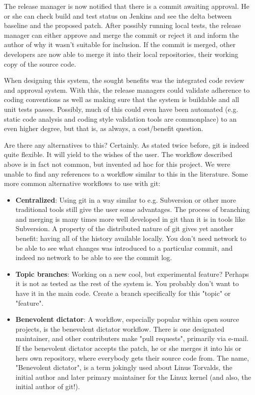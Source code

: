 \documentclass{article}
\begin{document}
The release manager is now notified that there is a commit awaiting
approval. He or she can check build and test status on Jenkins and see the
delta between baseline and the proposed patch. After possibly running local
tests, the release manager can either approve and merge the commit or
reject it and inform the author of why it wasn't suitable for inclusion.
If the commit is merged, other developers are now able to merge it into
their local repositories, their working copy of the source code.

When designing this system, the sought benefits was the integrated code 
review and approval system. With this, the release managers could validate 
adherence to coding conventions as well as making sure that the system
is buildable and all unit tests passes. Possibly, much of this could even
have been automated (e.g. static code analysis and coding style validation
tools are commonplace) to an even higher degree, but that is, as always, a 
cost/benefit question.

Are there any alternatives to this? Certainly. As stated twice before, git
is indeed quite flexible. It will yield to the wishes of the user. The 
workflow described above is in fact not common, but invented ad hoc for
this project. We were unable to find any references to a workflow similar
to this in the literature. Some more common alternative workflows to use
with git:

\begin{itemize}
 \item \textbf{Centralized}: 
	Using git in a way similar to e.g. Subversion or other more traditional
	tools still give the user some advantages. The process of branching and
	merging is many times more well developed in git than it is in tools like
	Subversion. A property of the distributed nature of git gives yet another
	benefit: having all of the history available locally. You don't need
	network to be able to see what changes was introduced to a particular
	commit, and indeed no network to be able to see the commit log.

 \item \textbf{Topic branches}: 
  Working on a new cool, but experimental feature? Perhaps it is not as 
  tested as the rest of the system is. You probably don't want to have 
  it in the main code. Create a branch specifically for this "topic" or
  "feature".

 \item \textbf{Benevolent dictator}: 
  A workflow, especially popular within open source projects, is the
  benevolent dictator workflow. There is one designated maintainer, and
  other contributers make "pull requests", primarily via e-mail.  If the
  benevolent dictator accepts the patch, he or she merges it into his or
  hers own repository, where everybody gets their source code from. The
  name, "Benevolent dictator", is a term jokingly used about Linus
  Torvalds, the initial author and later primary maintainer for the Linux
  kernel (and also, the initial author of git!).
\end{itemize}
\end{document}
